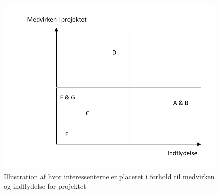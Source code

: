 \begin{figure}[!h]
	\includegraphics[width=1\textwidth]{Figure/interessentanalyse.pdf}
	\caption{Illustration af hvor interessenterne er placeret i forhold til medvirken og indflydelse for projektet}
\end{figure}



